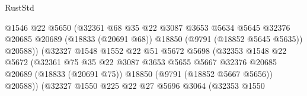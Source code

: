 \begin{lexlean}{RustStd}
\begin{coremodule}
                                        @1546
                                        @22
                                        @5650
                                        (@32361
                                          @68
                                          @35
                                          @22
                                          @3087
                                          @3653
                                          @5634
                                          @5645
                                          @32376
                                          @20685
                                          @20689
                                          (@18833 (@20691 @68))
                                          @18850
                                          (@9791 (@18852 @5645 @5635))
                                          @20588))
                                      (@32327
                                        @1548
                                        @1552
                                        @22
                                        @51
                                        @5672
                                        @5698
                                        (@32353
                                          @1548
                                          @22
                                          @5672
                                          (@32361
                                            @75
                                            @35
                                            @22
                                            @3087
                                            @3653
                                            @5655
                                            @5667
                                            @32376
                                            @20685
                                            @20689
                                            (@18833 (@20691 @75))
                                            @18850
                                            (@9791 (@18852 @5667 @5656))
                                            @20588))
                                        (@32327
                                          @1550
                                          @225
                                          @22
                                          @27
                                          @5696
                                          @3064
                                          (@32353
                                            @1550

\end{coremodule}
\end{lexlean}
